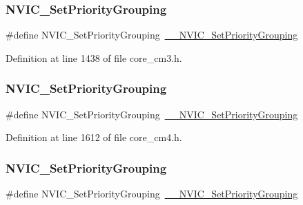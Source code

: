 \subsubsection{\texorpdfstring{N\+V\+I\+C\+\_\+\+Set\+Priority\+Grouping}{NVIC\_SetPriorityGrouping}\hspace{0.1cm}{\footnotesize\ttfamily [6/11]}}
{\footnotesize\ttfamily \#define N\+V\+I\+C\+\_\+\+Set\+Priority\+Grouping~\hyperlink{group___c_m_s_i_s___core___n_v_i_c_functions_gafc94dcbaee03e4746ade1f5bb9aaa56d}{\+\_\+\+\_\+\+N\+V\+I\+C\+\_\+\+Set\+Priority\+Grouping}}



Definition at line 1438 of file core\+\_\+cm3.\+h.

\mbox{\label{group___c_m_s_i_s___core___n_v_i_c_functions_ga0e798d5aec68cdd8263db86a76df788f}} 
\subsubsection{\texorpdfstring{N\+V\+I\+C\+\_\+\+Set\+Priority\+Grouping}{NVIC\_SetPriorityGrouping}\hspace{0.1cm}{\footnotesize\ttfamily [7/11]}}
{\footnotesize\ttfamily \#define N\+V\+I\+C\+\_\+\+Set\+Priority\+Grouping~\hyperlink{group___c_m_s_i_s___core___n_v_i_c_functions_gafc94dcbaee03e4746ade1f5bb9aaa56d}{\+\_\+\+\_\+\+N\+V\+I\+C\+\_\+\+Set\+Priority\+Grouping}}



Definition at line 1612 of file core\+\_\+cm4.\+h.

\mbox{\label{group___c_m_s_i_s___core___n_v_i_c_functions_ga0e798d5aec68cdd8263db86a76df788f}} 
\subsubsection{\texorpdfstring{N\+V\+I\+C\+\_\+\+Set\+Priority\+Grouping}{NVIC\_SetPriorityGrouping}\hspace{0.1cm}{\footnotesize\ttfamily [8/11]}}
{\footnotesize\ttfamily \#define N\+V\+I\+C\+\_\+\+Set\+Priority\+Grouping~\hyperlink{group___c_m_s_i_s___core___n_v_i_c_functions_gafc94dcbaee03e4746ade1f5bb9aaa56d}{\+\_\+\+\_\+\+N\+V\+I\+C\+\_\+\+Set\+Priority\+Grouping}}



